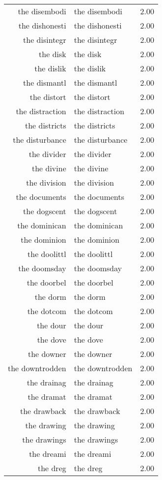 \begin{table}[ht]
\begin{tabular}{rlr}
  the disembodi & the disembodi & 2.00 \\ 
  the dishonesti & the dishonesti & 2.00 \\ 
  the disintegr & the disintegr & 2.00 \\ 
  the disk & the disk & 2.00 \\ 
  the dislik & the dislik & 2.00 \\ 
  the dismantl & the dismantl & 2.00 \\ 
  the distort & the distort & 2.00 \\ 
  the distraction & the distraction & 2.00 \\ 
  the districts & the districts & 2.00 \\ 
  the disturbance & the disturbance & 2.00 \\ 
  the divider & the divider & 2.00 \\ 
  the divine & the divine & 2.00 \\ 
  the division & the division & 2.00 \\ 
  the documents & the documents & 2.00 \\ 
  the dogscent & the dogscent & 2.00 \\ 
  the dominican & the dominican & 2.00 \\ 
  the dominion & the dominion & 2.00 \\ 
  the doolittl & the doolittl & 2.00 \\ 
  the doomsday & the doomsday & 2.00 \\ 
  the doorbel & the doorbel & 2.00 \\ 
  the dorm & the dorm & 2.00 \\ 
  the dotcom & the dotcom & 2.00 \\ 
  the dour & the dour & 2.00 \\ 
  the dove & the dove & 2.00 \\ 
  the downer & the downer & 2.00 \\ 
  the downtrodden & the downtrodden & 2.00 \\ 
  the drainag & the drainag & 2.00 \\ 
  the dramat & the dramat & 2.00 \\ 
  the drawback & the drawback & 2.00 \\ 
  the drawing & the drawing & 2.00 \\ 
  the drawings & the drawings & 2.00 \\ 
  the dreami & the dreami & 2.00 \\ 
  the dreg & the dreg & 2.00 \\ 

\end{tabular}
\end{table}
